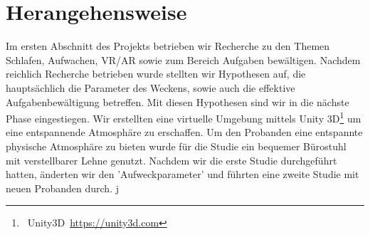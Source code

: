 \section{Herangehensweise}\label{sec:approach}  

Im ersten Abschnitt des Projekts betrieben wir Recherche zu den Themen Schlafen, Aufwachen, VR/AR sowie zum Bereich Aufgaben bewältigen. Nachdem reichlich Recherche betrieben wurde stellten wir Hypothesen auf, die hauptsächlich die Parameter des Weckens, sowie auch die effektive Aufgabenbewältigung betreffen. Mit diesen Hypothesen sind wir in die nächste Phase eingestiegen. 
Wir erstellten eine virtuelle Umgebung mittels Unity 3D\footnote{~Unity3D~\url{https://unity3d.com}} um eine entspannende Atmosphäre zu erschaffen. Um den Probanden eine entspannte physische Atmosphäre zu bieten wurde für die Studie ein bequemer Bürostuhl mit verstellbarer Lehne genutzt. Nachdem wir die erste Studie durchgeführt hatten, änderten wir den 'Aufweckparameter' und führten eine zweite Studie mit neuen Probanden durch. 
j